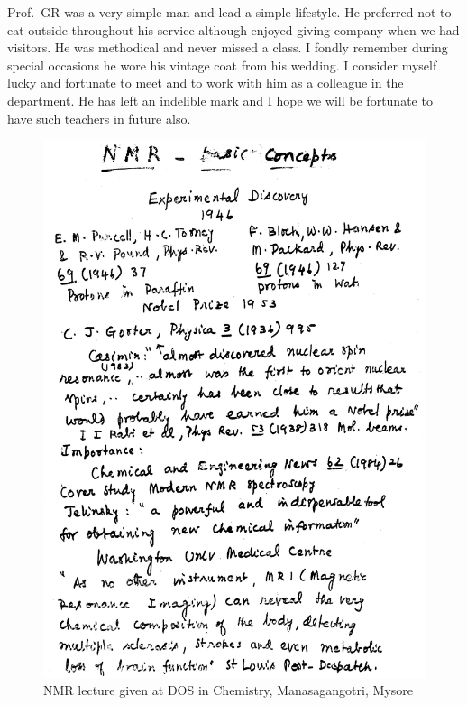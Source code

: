 Prof.\ GR was a very simple man and lead a simple lifestyle. He preferred not to eat outside throughout his
service although enjoyed giving company when we had visitors. He was methodical and never missed a class. I
fondly remember during special occasions he wore his vintage coat from his wedding. I consider myself lucky and
fortunate to meet and to work with him as a colleague in the department. He has left an indelible mark and I
hope we will be fortunate to have such teachers in future also.
\begin{figure}[H]
\centering
\includegraphics[scale=0.4]{src/images/chap8/1.eps}
\caption{NMR lecture given at DOS in Chemistry, Manasagangotri, Mysore}
\end{figure}
